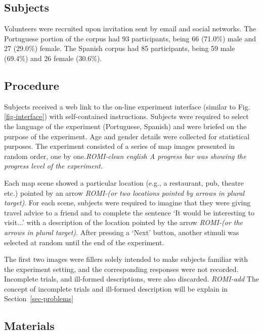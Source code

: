\documentclass{article}
\begin{document}
\subsection{Subjects}

Volunteers were recruited upon  invitation sent by email and social networks. The Portuguese portion of the corpus had 93 participants, being 66 (71.0\%) male and 27 (29.0\%) female. The Spanish corpus had 85 participants, being 59 male (69.4\%) and 26 female (30.6\%).


\subsection{Procedure}

Subjects received a web link to the on-line experiment interface (similar to Fig. \ref{fig-interface}) with self-contained instructions. Subjects were required to select the language of the experiment (Portuguese, Spanish) and were briefed on the purpose of the experiment. Age and gender details were collected for statistical purposes. The experiment consisted of a series of map images presented in random order, one by one.{\it ROMI-clean english A progress bar was showing the progress level of the experiment.} 

Each map scene showed a particular location (e.g., a restaurant, pub, theatre etc.) pointed by an arrow  {\it ROMI-(or two locations pointed by arrows in plural target)}. For each scene, subjects were required to imagine that they were giving travel advice to a friend and to complete the sentence `It would be interesting to visit...' with a description of the location pointed by the arrow {\it ROMI-(or the arrows in plural target)}. After pressing a `Next' button, another stimuli was selected at random until the end of the experiment. 

The first two images were fillers solely intended to make subjects familiar with the experiment setting, and the corresponding responses were not recorded. Incomplete trials, and ill-formed descriptions, were also discarded. {\it ROMI-add } The concept of incomplete trials and ill-formed description will be explain in  Section~\ref{sec-problems} 



\subsection{Materials}
\end{document}
